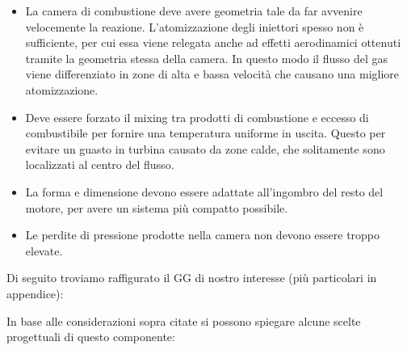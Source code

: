 \documentclass[11pt,a4paper]{article}
\begin{document}
\begin{itemize}[wide,itemsep=3pt,topsep=3pt]

\item
La camera di combustione deve avere geometria tale da far avvenire velocemente la reazione. L’atomizzazione degli iniettori spesso non è sufficiente, per cui essa viene relegata anche ad effetti aerodinamici ottenuti tramite la geometria stessa della camera. In questo modo il flusso del gas viene differenziato in zone di alta e bassa velocità che causano una migliore atomizzazione.
\item
Deve essere forzato il mixing tra prodotti di combustione e eccesso di combustibile per fornire una temperatura uniforme in uscita. Questo per evitare un guasto in turbina causato da zone calde, che solitamente sono localizzati al centro del flusso. 
\item
La forma e dimensione devono essere adattate all'ingombro del resto del motore, per avere un sistema più compatto possibile.
\item
Le perdite di pressione prodotte nella camera non devono essere troppo elevate. 

\end{itemize}

Di seguito troviamo raffigurato il GG di nostro interesse (più particolari in appendice):


In base alle considerazioni sopra citate si possono spiegare alcune scelte progettuali di questo componente:
\end{document}
